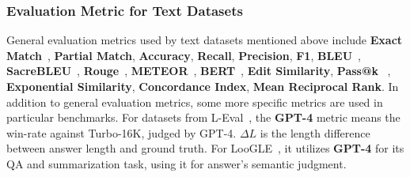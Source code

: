 \subsubsection{Evaluation Metric for Text Datasets}\label{sssec:text_metric}
General evaluation metrics used by text datasets mentioned above include \textbf{Exact Match}~\cite{DBLP:journals/corr/RajpurkarZLL16}, \textbf{Partial Match}, \textbf{Accuracy}, \textbf{Recall}, \textbf{Precision}, \textbf{F1}, \textbf{BLEU}~\cite{papineni-etal-2002-bleu}, \textbf{SacreBLEU}~\cite{post-2018-call-sacrebleu}, \textbf{Rouge}~\cite{lin-2004-rouge}, \textbf{METEOR}~\cite{denkowski-lavie-2011-meteor}, \textbf{BERT}~\cite{zhang2020bertscoreevaluatingtextgeneration}, \textbf{Edit Similarity}, \textbf{Pass@k}~\cite{chen2021evaluatinglargelanguagemodels} , \textbf{Exponential Similarity}, \textbf{Concordance Index},  \textbf{Mean Reciprocal Rank}. In addition to general evaluation metrics, some more specific metrics are used in particular benchmarks. For datasets from L-Eval~\cite{an_l-eval:_2023}, the \textbf{GPT-4} metric means the win-rate against Turbo-16K, judged by GPT-4. \textbf{$\Delta L$} is the length difference between answer length and ground truth. For LooGLE~\cite{li_loogle:_2023}, it utilizes \textbf{GPT-4} for its QA and summarization task, using it for answer's semantic judgment.
